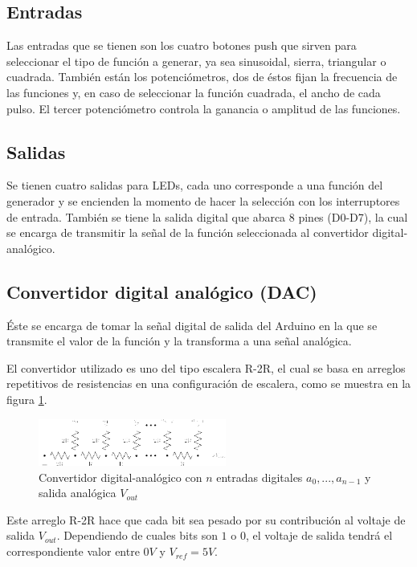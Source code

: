 \documentclass[11pt]{article}
\begin{document}
\subsection*{Entradas}
Las entradas que se tienen son los cuatro botones push que sirven para seleccionar el tipo de función a generar, ya sea sinusoidal, sierra, triangular o cuadrada. También están los potenciómetros, dos de éstos fijan la frecuencia de las funciones y, en caso de seleccionar la función cuadrada, el ancho de cada pulso. El tercer potenciómetro controla la ganancia o amplitud de las funciones.


\subsection*{Salidas}
Se tienen cuatro salidas para LEDs, cada uno corresponde a una función del generador y se encienden la momento de hacer la selección con los interruptores de entrada. También se tiene la salida digital que abarca 8 pines (D0-D7), la cual se encarga de transmitir la señal de la función seleccionada al convertidor digital-analógico.


\subsection*{Convertidor digital analógico (DAC)}
Éste se encarga de tomar la señal digital de salida del Arduino en la que se transmite el valor de la función y la transforma a una señal analógica.

\noindent El convertidor utilizado es uno del tipo escalera R-2R, el cual se basa en arreglos repetitivos de resistencias en una configuración de escalera, como se muestra en la figura \ref{fig:DAC_diagram}.

\begin{figure}[htb]
\centering
\includegraphics[width = 0.55\textwidth]{R2r-ladder.png}
\caption{Convertidor digital-analógico con $n$ entradas digitales $a_0,...,a_{n-1}$ y salida analógica $V_{out}$}
\label{fig:DAC_diagram}
\end{figure}

\noindent Este arreglo R-2R hace que cada bit sea pesado por su contribución al voltaje de salida $V_{out}$. Dependiendo de cuales bits son $1$ o $0$, el voltaje de salida tendrá el correspondiente valor entre $0V$ y $V_{ref}=5V$.
\end{document}
